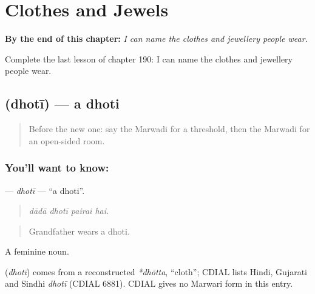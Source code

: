 
\chapter{Clothes and Jewels}
\label{ch:mw-clothes-and-jewels}

\begin{chapteropening}
\textbf{By the end of this chapter:} \emph{I can name the clothes and jewellery people wear.}

Complete the last lesson of chapter 190: I can name the clothes and jewellery people wear.
\end{chapteropening}

\section[\texorpdfstring{\mw{धोती} (dhotī)}{धोती (dhotī)}]{ (dhotī) — a dhoti}

\label{lesson:MW-C190-dhoti}



\begin{quote}
Before the new one: say the Marwadi for a threshold, then the Marwadi for an open-sided room.
\end{quote}

\subsection*{You'll want to know: }
\textbf{} — \emph{dhotī} — \textquotedblleft{}a dhoti\textquotedblright{}.

\begin{quote}
   
\end{quote}

\begin{quote}
\emph{dādā dhotī pairai hai.}
\end{quote}

\begin{quote}
Grandfather wears a dhoti.
\end{quote}

A feminine noun.

\begin{cousinweb}
\textbf{} (\emph{dhotī}) comes from a reconstructed \emph{*dhōtta}, \textquotedblleft{}cloth\textquotedblright{}; CDIAL lists Hindi, Gujarati and Sindhi \emph{dhotī} (CDIAL 6881). CDIAL gives no Marwari form in this entry.
\end{cousinweb}


